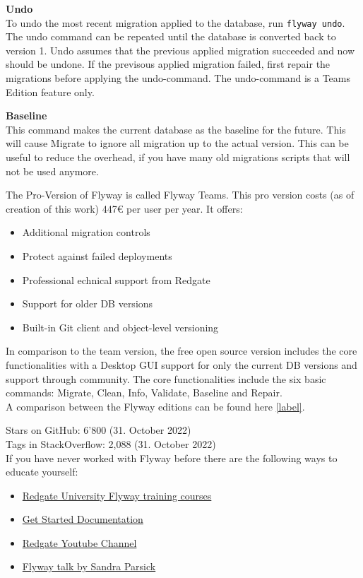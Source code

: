 \textbf{Undo}\\
To undo the most recent migration applied to the database, run \texttt{flyway undo}. The undo command can be repeated until the database is converted back to version 1.
Undo assumes that the previous applied migration succeeded and now should be undone. If the previsous applied migration failed, first repair the migrations before applying the undo-command. 
The undo-command is a Teams Edition feature only.

\textbf{Baseline}\\
This command makes the current database as the baseline for the future. This will cause Migrate to ignore all migration up to the actual version.
This can be useful to reduce the overhead, if you have many old migrations scripts that will not be used anymore.

%
The Pro-Version of Flyway is called Flyway Teams. This pro version costs (as of creation of this work) 447€ per user per year. It offers:
\begin{itemize}
	\item Additional migration controls
	\item Protect against failed deployments
	\item Professional echnical support from Redgate
	\item Support for older DB versions
	\item Built-in Git client and object-level versioning
\end{itemize}

In comparison to the team version, the free open source version includes the core functionalities with a Desktop GUI support for only the current DB versions and support through community. The core functionalities include the six basic commands: Migrate, Clean, Info, Validate, Baseline and Repair.\\

A comparison between the Flyway editions can be found here \autoref{label}.\\

%
Stars on GitHub: 6'800 (31. October 2022)\\
Tags in StackOverflow: 2,088 (31. October 2022)\\

%
If you have never worked with Flyway before there are the following ways to educate yourself:
\begin{itemize}
	\item \href{https://www.red-gate.com/hub/university/courses/flyway}{Redgate University Flyway training courses}
	\item \href{https://flywaydb.org/documentation}{Get Started Documentation}
	\item \href{https://www.youtube.com/playlist?list=PLhFdCK734P8DYHYYWaJpzJJ-qZFZ_JTHM}{Redgate Youtube Channel}
	\item \href{https://www.youtube.com/watch?v=dzRzlDpdDW4}{Flyway talk by Sandra Parsick}
\end{itemize}

